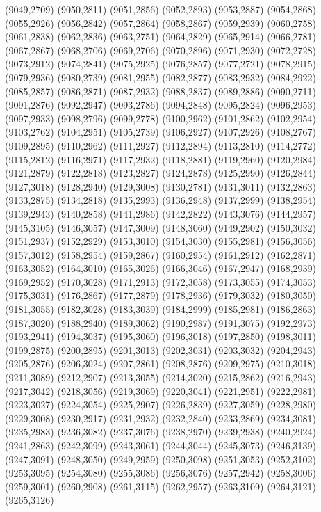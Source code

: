 (9049,2709)
(9050,2811)
(9051,2856)
(9052,2893)
(9053,2887)
(9054,2868)
(9055,2926)
(9056,2842)
(9057,2864)
(9058,2867)
(9059,2939)
(9060,2758)
(9061,2838)
(9062,2836)
(9063,2751)
(9064,2829)
(9065,2914)
(9066,2781)
(9067,2867)
(9068,2706)
(9069,2706)
(9070,2896)
(9071,2930)
(9072,2728)
(9073,2912)
(9074,2841)
(9075,2925)
(9076,2857)
(9077,2721)
(9078,2915)
(9079,2936)
(9080,2739)
(9081,2955)
(9082,2877)
(9083,2932)
(9084,2922)
(9085,2857)
(9086,2871)
(9087,2932)
(9088,2837)
(9089,2886)
(9090,2711)
(9091,2876)
(9092,2947)
(9093,2786)
(9094,2848)
(9095,2824)
(9096,2953)
(9097,2933)
(9098,2796)
(9099,2778)
(9100,2962)
(9101,2862)
(9102,2954)
(9103,2762)
(9104,2951)
(9105,2739)
(9106,2927)
(9107,2926)
(9108,2767)
(9109,2895)
(9110,2962)
(9111,2927)
(9112,2894)
(9113,2810)
(9114,2772)
(9115,2812)
(9116,2971)
(9117,2932)
(9118,2881)
(9119,2960)
(9120,2984)
(9121,2879)
(9122,2818)
(9123,2827)
(9124,2878)
(9125,2990)
(9126,2844)
(9127,3018)
(9128,2940)
(9129,3008)
(9130,2781)
(9131,3011)
(9132,2863)
(9133,2875)
(9134,2818)
(9135,2993)
(9136,2948)
(9137,2999)
(9138,2954)
(9139,2943)
(9140,2858)
(9141,2986)
(9142,2822)
(9143,3076)
(9144,2957)
(9145,3105)
(9146,3057)
(9147,3009)
(9148,3060)
(9149,2902)
(9150,3032)
(9151,2937)
(9152,2929)
(9153,3010)
(9154,3030)
(9155,2981)
(9156,3056)
(9157,3012)
(9158,2954)
(9159,2867)
(9160,2954)
(9161,2912)
(9162,2871)
(9163,3052)
(9164,3010)
(9165,3026)
(9166,3046)
(9167,2947)
(9168,2939)
(9169,2952)
(9170,3028)
(9171,2913)
(9172,3058)
(9173,3055)
(9174,3053)
(9175,3031)
(9176,2867)
(9177,2879)
(9178,2936)
(9179,3032)
(9180,3050)
(9181,3055)
(9182,3028)
(9183,3039)
(9184,2999)
(9185,2981)
(9186,2863)
(9187,3020)
(9188,2940)
(9189,3062)
(9190,2987)
(9191,3075)
(9192,2973)
(9193,2941)
(9194,3037)
(9195,3060)
(9196,3018)
(9197,2850)
(9198,3011)
(9199,2875)
(9200,2895)
(9201,3013)
(9202,3031)
(9203,3032)
(9204,2943)
(9205,2876)
(9206,3024)
(9207,2861)
(9208,2876)
(9209,2975)
(9210,3018)
(9211,3089)
(9212,2907)
(9213,3055)
(9214,3020)
(9215,2862)
(9216,2943)
(9217,3042)
(9218,3056)
(9219,3069)
(9220,3041)
(9221,2951)
(9222,2981)
(9223,3027)
(9224,3054)
(9225,2907)
(9226,2839)
(9227,3059)
(9228,2980)
(9229,3008)
(9230,2917)
(9231,2932)
(9232,2840)
(9233,2869)
(9234,3081)
(9235,2983)
(9236,3082)
(9237,3076)
(9238,2970)
(9239,2938)
(9240,2924)
(9241,2863)
(9242,3099)
(9243,3061)
(9244,3044)
(9245,3073)
(9246,3139)
(9247,3091)
(9248,3050)
(9249,2959)
(9250,3098)
(9251,3053)
(9252,3102)
(9253,3095)
(9254,3080)
(9255,3086)
(9256,3076)
(9257,2942)
(9258,3006)
(9259,3001)
(9260,2908)
(9261,3115)
(9262,2957)
(9263,3109)
(9264,3121)
(9265,3126)
